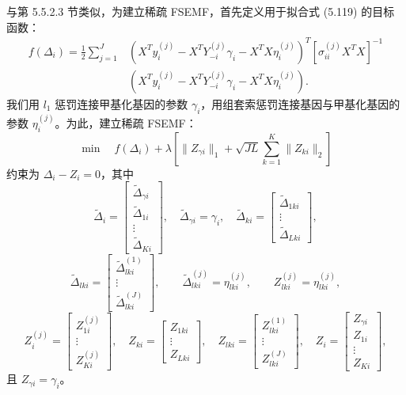 与第 5.5.2.3 节类似，为建立稀疏 FSEMF，首先定义用于拟合式 (5.119) 的目标函数：
\begin{equation}
\begin{aligned}
f(\Delta_i)=\frac12\sum_{j=1}^J
&\left(X^Ty_i^{(j)}-X^TY_{-i}^{(j)}\gamma_i-X^TX\eta_i^{(j)}\right)^T
\left[\sigma_{ii}^{(j)}X^TX\right]^{-1}\\
&\left(X^Ty_i^{(j)}-X^TY_{-i}^{(j)}\gamma_i-X^TX\eta_i^{(j)}\right).
\end{aligned}
\tag{5.120}
\end{equation}
我们用 $l_1$ 惩罚连接甲基化基因的参数 $\gamma_i$，用组套索惩罚连接基因与甲基化基因的参数 $\eta_i^{(j)}$。为此，建立稀疏 FSEMF：
\begin{equation}
\min\quad f(\Delta_i)+\lambda\left[\lVert Z_{\gamma i}\rVert_1
+\sqrt{JL}\sum_{k=1}^K\lVert Z_{ki}\rVert_2\right]
\tag{5.121}
\end{equation}
约束为 $\Delta_i-Z_i=0$，其中
\[
\widetilde\Delta_i=\begin{bmatrix}\widetilde\Delta_{\gamma i}\\\widetilde\Delta_{1i}\\\vdots\\\widetilde\Delta_{Ki}\end{bmatrix},\quad
\widetilde\Delta_{\gamma i}=\gamma_i,\quad
\widetilde\Delta_{ki}=\begin{bmatrix}\widetilde\Delta_{1ki}\\\vdots\\\widetilde\Delta_{Lki}\end{bmatrix},
\]
\[
\widetilde\Delta_{lki}=\begin{bmatrix}\widetilde\Delta_{lki}^{(1)}\\\vdots\\\widetilde\Delta_{lki}^{(J)}\end{bmatrix},\qquad
\widetilde\Delta_{lki}^{(j)}=\eta_{lki}^{(j)},\qquad Z_{lki}^{(j)}=\eta_{lki}^{(j)},
\]
\[
Z_i^{(j)}=\begin{bmatrix}Z_{1i}^{(j)}\\\vdots\\Z_{Ki}^{(j)}\end{bmatrix},\quad
Z_{ki}=\begin{bmatrix}Z_{1ki}\\\vdots\\Z_{Lki}\end{bmatrix},\quad
Z_{lki}=\begin{bmatrix}Z_{lki}^{(1)}\\\vdots\\Z_{lki}^{(J)}\end{bmatrix},\quad
Z_i=\begin{bmatrix}Z_{\gamma i}\\Z_{1i}\\\vdots\\Z_{Ki}\end{bmatrix},
\]
且 $Z_{\gamma i}=\gamma_i$。

